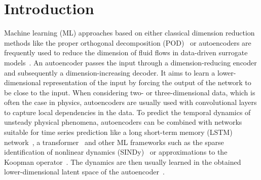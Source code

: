 \section{Introduction}
Machine learning (ML) approaches based on either classical dimension reduction methods like the proper orthogonal decomposition (POD)~\cite{lumley1967structure} or autoencoders are frequently used to reduce the dimension of fluid flows in data-driven surrogate models~\cite{lusch:2018, Swischuk.2019, eivazi:2020, Agostini20, GANTI2020104626, wu:2021}.
An autoencoder passes the input through a dimension-reducing encoder and subsequently a dimension-increasing decoder. It aims to learn a lower-dimensional representation of the input by forcing the output of the network to be close to the input.  When considering two- or three-dimensional data, which is often the case in physics, autoencoders are usually used with convolutional layers to capture local dependencies in the data. 
To predict the temporal dynamics of unsteady physical phenomena, autoencoders can be combined with networks suitable for time series prediction like a long short-term memory (LSTM) network~\cite{hochreiter:1997}, a transformer~\cite{vaswani:2017} and other ML frameworks such as the sparse identification of nonlinear dynamics (SINDy)~\cite{brunton2016discovering} or approximations to the Koopman operator~\cite{Koopman:1931}. The dynamics are then usually learned in the obtained lower-dimensional latent space of the autoencoder~\cite{lusch:2018, eivazi:2020, wu:2021, GUPTA2022105239, Hemmasian:2023, ANDO2023106047, ZHANG2023105883, solera-rico:2024, schwarz:2024}.


